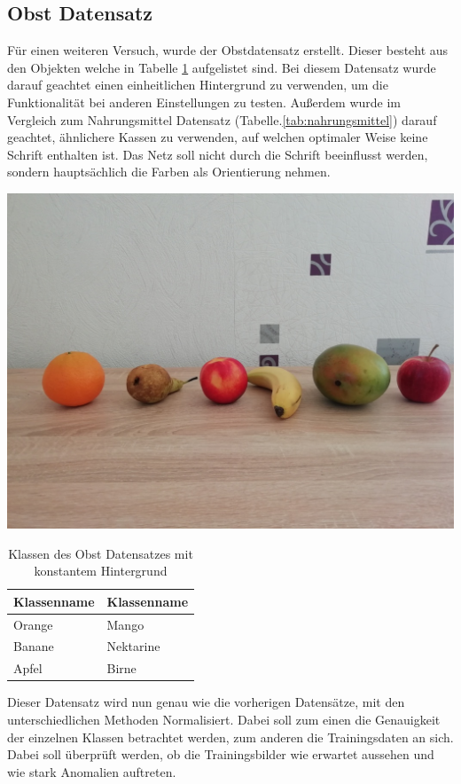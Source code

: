 \documentclass[a4paper,12pt,oneside]{article}
\begin{document}
\subsection{Obst Datensatz}
Für einen weiteren Versuch, wurde der Obstdatensatz erstellt. Dieser besteht aus den Objekten welche in Tabelle \ref{tab:obst} aufgelistet sind. Bei diesem Datensatz wurde darauf geachtet einen einheitlichen Hintergrund zu verwenden, um die Funktionalität bei anderen Einstellungen zu testen. Außerdem wurde im Vergleich zum Nahrungsmittel Datensatz (Tabelle.\ref{tab:nahrungsmittel}) darauf geachtet, ähnlichere Kassen zu verwenden, auf welchen optimaler Weise keine Schrift enthalten ist. Das Netz soll nicht durch die Schrift beeinflusst werden, sondern hauptsächlich die Farben als Orientierung nehmen.
\begin{table}[htb]
\caption{Klassen des Obst Datensatzes mit konstantem Hintergrund}
\center
\begin{minipage}[c]{.4\textwidth} 
\includegraphics[width=.7\textwidth]{Sources/Obst_mit_hintergrund}  
\end{minipage} 
\begin{minipage}[c]{.4\textwidth}\label{tab:obst}   
\begin{tabular}{|l|l|}
\hline
Klassenname & Klassenname\\
\hline
Orange & Mango\\
Banane & Nektarine\\
Apfel & Birne\\
\hline
\end{tabular} 
\end{minipage}
\end{table}  
Dieser Datensatz wird nun genau wie die vorherigen Datensätze, mit den unterschiedlichen Methoden Normalisiert. Dabei soll zum einen die Genauigkeit der einzelnen Klassen betrachtet werden, zum anderen die Trainingsdaten an sich. Dabei soll überprüft werden, ob die Trainingsbilder wie erwartet aussehen und wie stark Anomalien auftreten. 
\end{document}
